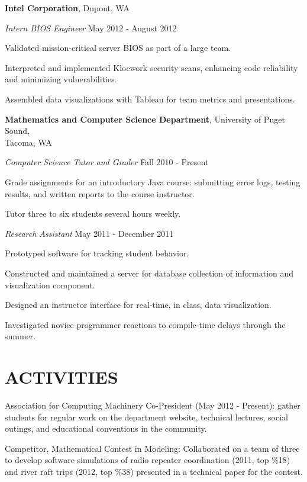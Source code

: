 \documentclass[line,margin]{res}
\newenvironment{itemize*}%
  {\begin{itemize}%
    \setlength{\parsep}{0pt}
    \setlength{\itemsep}{0pt}%
    \setlength{\parskip}{0pt}}%
  {\end{itemize}}
\begin{document}
\begin{resume}
\textbf{Intel Corporation}, Dupont, WA

{\sl Intern BIOS Engineer} \hfill May 2012 - August 2012
\begin{itemize*}
    \item Validated mission-critical server BIOS as part of a large team.
    \item Interpreted and implemented Klocwork security scans, enhancing
        code reliability and minimizing vulnerabilities.
    \item Assembled data visualizations with Tableau for team metrics and
        presentations.
\end{itemize*}

\textbf{Mathematics and Computer Science Department},
University of Puget Sound,\\
Tacoma, WA

{\sl Computer Science Tutor and Grader} \hfill Fall 2010 - Present
\begin{itemize*}
    \item Grade assignments for an introductory Java course: submitting
      error logs, testing results, and written reports to the course 
      instructor.
    \item Tutor three to six students several hours weekly.
\end{itemize*}

{\sl Research Assistant} \hfill May 2011 - December 2011
\begin{itemize*}
    \item Prototyped software for tracking student behavior.
    \item Constructed and maintained a server for database collection of
      information and visualization component.
    \item Designed an instructor interface for real-time, in class, data
      visualization.
    \item Investigated novice programmer reactions to compile-time delays
        through the summer.
\end{itemize*}

\vspace*{.2cm}

\section{ACTIVITIES}

\begin{itemize*}
\item Association for Computing Machinery Co-President (May 2012 - Present): gather
    students for regular work on the department website, technical lectures,
    social outings, and educational conventions in the community.
\item Competitor, Mathematical Contest in Modeling: Collaborated on a team of three to
    develop software simulations of radio repeater coordination (2011, top \%18) and river
    raft trips (2012, top \%38) presented in a technical paper for the contest.\\
\end{itemize*}


\end{resume}
\end{document}

